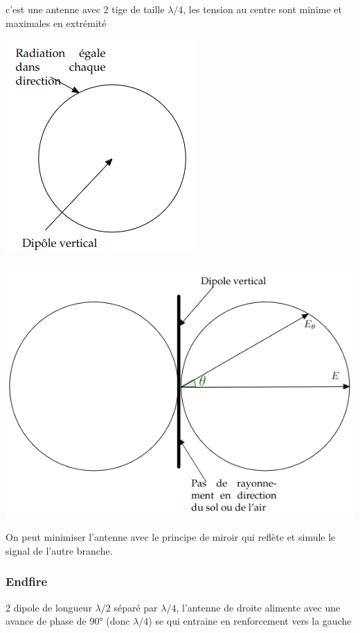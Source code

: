 \documentclass[12pt]{article}
\begin{document}
		c'est une antenne avec 2 tige de taille $\lambda /4$, les tension au centre sont minime et maximales en extrémité
	
		\begin{minipage}{.6\textwidth}
  \centering
  \includegraphics[width=.5\textwidth]{img/dipole1.png}

\end{minipage}%
\begin{minipage}{.5\textwidth}
  \centering
  \includegraphics[width=.8\textwidth]{img/dipole2.png}

\end{minipage}
\begin{minipage}{.5\textwidth}
  \centering
\end{minipage}
		On peut minimiser l'antenne avec le principe de miroir qui reflète et simule le signal de l'autre branche.
		
	\subsubsection{Endfire}
		2 dipole de longueur $\lambda/2$ séparé par $\lambda/4$, l'antenne de droite alimente avec une avance de phase de 90° (donc $\lambda/4$) se qui entraine en renforcement vers la gauche
		
\end{document}

